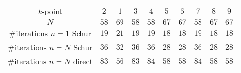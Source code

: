 \begin{tabular}{cccccccccc}
$k$-point & $2$ & $1$ & $3$ & $4$ & $5$ & $6$ & $7$ & $8$ & $9$\\
$N$ & $58$ & $69$ & $58$ & $58$ & $67$ & $67$ & $58$ & $67$ & $67$\\
\#iterations $n=1$ Schur & $19$ & $21$ & $19$ & $19$ & $18$ & $18$ & $19$ & $18$ & $18$\\
\#iterations $n=N$ Schur & $36$ & $32$ & $36$ & $36$ & $28$ & $28$ & $36$ & $28$ & $28$\\
\#iterations $n=N$ direct & $83$ & $56$ & $83$ & $84$ & $58$ & $58$ & $84$ & $58$ & $58$\\
\end{tabular}
